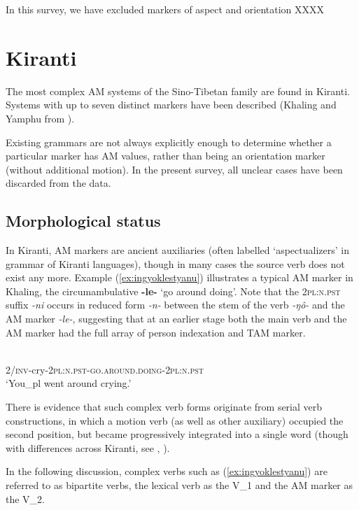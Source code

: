 \documentclass[oneside,a4paper,11pt]{article}
\newcommand{\ipa}[1]{{\phon\textit{#1}}}
\begin{document}
In this survey, we have excluded markers of aspect and orientation XXXX

\section{Kiranti} 
The most complex AM systems of the Sino-Tibetan family are found in Kiranti. Systems with up to seven distinct markers have been described (Khaling and Yamphu from \citealt[137-194]{rutgers98yamphu}).

Existing grammars are not always explicitly enough to determine whether a particular marker has AM values, rather than being an orientation marker (without additional motion). In the present survey, all unclear cases have been discarded from the data.  

\subsection{Morphological status}

In Kiranti, AM markers are ancient auxiliaries (often labelled `aspectualizers' in grammar of Kiranti languages), though in many cases the source verb does not exist any more.  Example (\ref{ex:ingyoklestyanu}) illustrates a typical AM marker in Khaling, the circumambulative \textbf{-le-} `go around doing'. Note that the \textsc{2pl:n.pst} suffix \ipa{-ni} occurs in reduced form \ipa{-n-} between the stem of the verb \ipa{-ŋô-} and  the AM marker \ipa{-le-}, suggesting that at an earlier stage both the main verb and the AM marker had the full array of person indexation and TAM marker.

\begin{exe}
\ex \label{ex:ingyoklestyanu}
\gll \ipa{ʔi-ŋô-n-\textbf{le}-ni} \\
2/\textsc{inv}-cry-\textsc{2pl:n.pst}-\textsc{go.around.doing}-\textsc{2pl:n.pst} \\
\glt `You_{pl} went around crying.' 
\end{exe}

There is evidence that such complex verb forms originate from serial verb constructions, in which a motion verb (as well as other auxiliary) occupied the second position, but became progressively integrated into a single word (though with differences across Kiranti, see \citealt{bickel07chintang}, \citealt{schiering10prosodic}). 

In the following discussion, complex verbs such as (\ref{ex:ingyoklestyanu}) are referred to as bipartite verbs, the lexical verb as the V_1 and the AM marker as the V_2.
\end{document}
